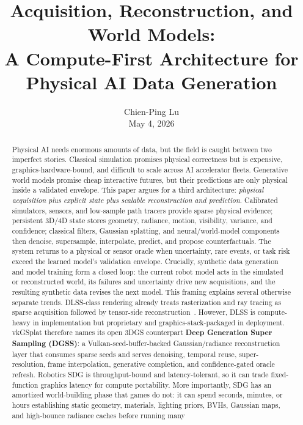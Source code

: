 \documentclass[10pt,journal,onecolumn]{IEEEtran}
\title{Acquisition, Reconstruction, and World Models:\\A Compute-First Architecture for Physical AI Data Generation}
\author{%
    Chien-Ping Lu\\[0.35em]
    \normalsize May 4, 2026%
}
\begin{document}
\maketitle

\begin{abstract}
\setlength{\parindent}{0pt}
\noindent
Physical AI needs enormous amounts of data, but the field is caught between two
imperfect stories. Classical simulation promises physical correctness but is
expensive, graphics-hardware-bound, and difficult to scale across AI
accelerator fleets. Generative world models promise cheap interactive futures,
but their predictions are only physical inside a validated envelope. This paper
argues for a third architecture: \emph{physical acquisition plus explicit state
plus scalable reconstruction and prediction}. Calibrated simulators, sensors,
and low-sample path tracers provide sparse physical evidence; persistent 3D/4D
state stores geometry, radiance, motion, visibility, variance, and confidence;
classical filters, Gaussian splatting, and neural/world-model components then
denoise, supersample, interpolate, predict, and propose counterfactuals. The
system returns to a physical or sensor oracle when uncertainty, rare events, or
task risk exceed the learned model's validation envelope. Crucially, synthetic
data generation and model training form a closed loop: the current robot model
acts in the simulated or reconstructed world, its failures and uncertainty drive
new acquisitions, and the resulting synthetic data revises the next model.
This framing explains several otherwise separate trends. DLSS-class rendering
already treats rasterization and ray tracing as sparse acquisition followed by
tensor-side reconstruction~\cite{nvidia-dlss,liu2020nsrr,nvidia-dlss3,nvidia-dlss35rr}.
However, DLSS is compute-heavy in implementation but proprietary and
graphics-stack-packaged in deployment. vkGSplat therefore names its open
3DGS counterpart \textbf{Deep Generation Super Sampling (DGSS)}: a
Vulkan-seed-buffer-backed Gaussian/radiance reconstruction layer that consumes
sparse seeds and serves denoising, temporal reuse, super-resolution, frame
interpolation, generative completion, and confidence-gated oracle refresh.
Robotics SDG is throughput-bound and latency-tolerant, so it can trade
fixed-function graphics latency for compute portability. More importantly, SDG
has an amortized world-building phase that games do not: it can spend seconds,
minutes, or hours establishing static geometry, materials, lighting priors,
BVHs, Gaussian maps, and high-bounce radiance caches before running many

\end{abstract}
\end{document}

